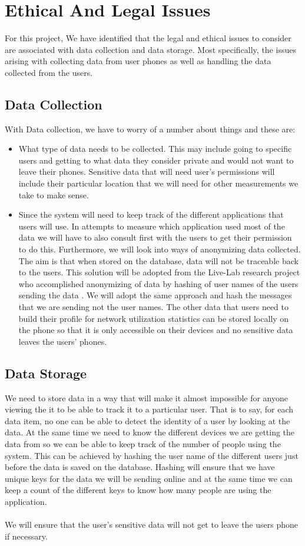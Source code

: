 \section{Ethical And Legal Issues}
For this project, We have identified that the legal and ethical issues to consider are associated with data collection and data storage. Most specifically, the issues arising with collecting data from user phones as well as handling the data collected from the users.

\subsection*{Data Collection}
With Data collection, we have to worry of a number about things and these are:
\begin{itemize}
	\item What type of data needs to be collected. This may include going to specific users and getting to what data they consider private and would not want to leave their phones. Sensitive data that will need user's permissions will include their particular location that we will need for other measurements we take to make sense. 
	\item Since the system will need to keep track of the different applications that users will use. In attempts to measure which application used most of the data we will have to also consult first with the users to get their permission to do this. Furthermore, we will look into ways of anonymizing data collected. The aim is that when stored on the database, data will not be traceable back to the users. This solution will be adopted from the Live-Lab research project who accomplished anonymizing of data by hashing of user names of the users sending the data \cite{Shepard:2011:LMW:1925019.1925023}. We will adopt the same approach  and hash the messages that we are sending not the user names. The other data that users need to build their profile for network utilization statistics can be stored locally on the phone so that it is only accessible on their devices and no sensitive data leaves the users' phones.
\end{itemize}
\subsection*{Data Storage}%
 We need to store data in a way that will make it almost impossible for anyone viewing the it to be able to track it to a particular user. That is to say, for each data item, no one can be able to detect the identity of a user by looking at the data. At the same time we need to know the different devices we are getting the data from so we can be able to keep track of the number of people using the system. This can be achieved by hashing the user name of the different users just before the data is saved on the database. Hashing will ensure that we have unique keys for the data we will be sending online and at the same time we can keep a count of the different keys to know how many people are using the application.

\paragraph{}
We will ensure that the user's sensitive data will not get to leave the users phone if necessary. 
